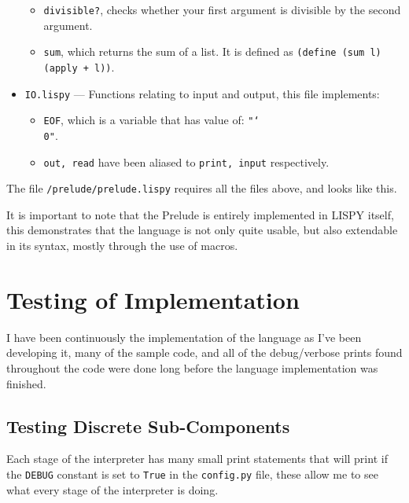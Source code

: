 \documentclass{article}
\newcommand{\code}[1]{\texttt{#1}}
\begin{document}
\begin{itemize}
\begin{itemize}
                \item \code{divisible?}, checks whether your first argument is
                divisible by the second argument.
                \item \code{sum}, which returns the sum of a list. It is
                defined as \code{(define (sum l) (apply + l))}.
              \end{itemize}
      \item \code{IO.lispy} --- Functions relating to input and output, this file implements:
        \begin{itemize}
          \item \code{EOF}, which is a variable that has value of: \code{"\char`\\0"}.
          \item \code{out, read} have been aliased to \code{print, input}
          respectively.
        \end{itemize}
    \end{itemize}

    The file \code{/prelude/prelude.lispy} requires all the files above, and looks
    like this.


    It is important to note that the Prelude is entirely implemented in LISPY
    itself, this demonstrates that the language is not only quite usable, but also
    extendable in its syntax, mostly through the use of macros.

  \clearpage

\section{Testing of Implementation}
  I have been continuously the implementation of the language as I've been
  developing it, many of the sample code, and all of the debug/verbose prints
  found throughout the code were done long before the language implementation
  was finished.


  \subsection{Testing Discrete Sub-Components}
    Each stage of the interpreter has many small print statements that will
    print if the \code{DEBUG} constant is set to \code{True} in the \code{config.py}
    file, these allow me to see what every stage of the interpreter is doing.
\end{document}
